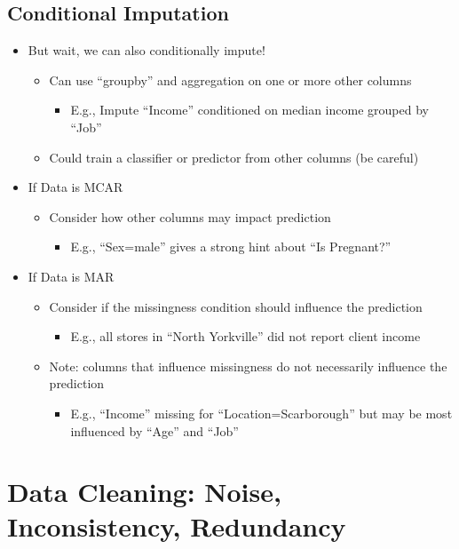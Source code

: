 \documentclass[11pt]{article}
\theoremstyle{definition}
\begin{document}
\subsection{Conditional Imputation}
\begin{itemize}
    \item But wait, we can also conditionally impute!
    \begin{itemize}
        \item Can use “groupby” and aggregation on one or more other columns
        \begin{itemize}
            \item E.g., Impute “Income” conditioned on median income grouped by “Job”
        \end{itemize}
        \item Could train a classifier or predictor from other columns (be careful)
    \end{itemize}
    \item If Data is MCAR
    \begin{itemize}
        \item Consider how other columns may impact prediction
        \begin{itemize}
            \item E.g., “Sex=male” gives a strong hint about “Is Pregnant?”
        \end{itemize}
    \end{itemize}
    \item If Data is MAR
    \begin{itemize}
        \item Consider if the missingness condition should influence the prediction
        \begin{itemize}
            \item E.g., all stores in “North Yorkville” did not report client income
        \end{itemize}
        \item Note: columns that influence missingness do not necessarily influence the prediction
        \begin{itemize}
            \item E.g., “Income” missing for “Location=Scarborough” but may be most influenced by “Age” and “Job”
        \end{itemize}
    \end{itemize}
\end{itemize}

\section{Data Cleaning: Noise,
Inconsistency, Redundancy}
\end{document}

